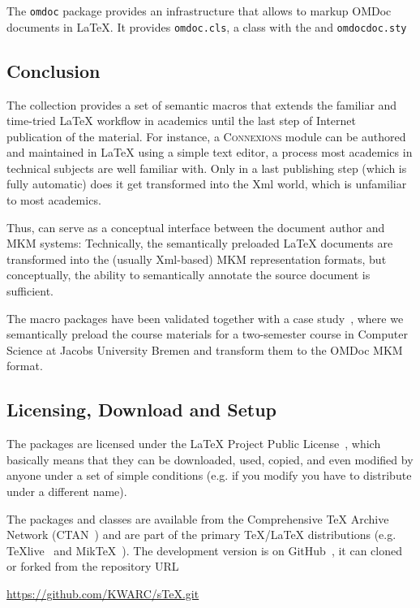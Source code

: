 \documentclass{article}
\makeatletter
\def\scsys#1{{{\sc #1}}\index{#1@{\sc #1}}}
\def\xml{\scsys{Xml}}
\def\omdoc{\scsys{OMDoc}}
\def\connexions{\scsys{Connexions}}
\def\connexions{\scshape{Connexions}}
\makeatother
\begin{document}
The \texttt{omdoc} package provides an infrastructure that allows to markup {\omdoc}
documents in {\LaTeX}. It provides \texttt{omdoc.cls}, a class with the and
{\texttt{omdocdoc.sty}}

\subsection{Conclusion}\label{sec:concl}

The {\stex} collection provides a set of semantic macros that extends the familiar and
time-tried {\LaTeX} workflow in academics until the last step of Internet publication of
the material. For instance, a {\connexions} module can be authored and maintained in
{\LaTeX} using a simple text editor, a process most academics in technical subjects are
well familiar with. Only in a last publishing step (which is fully automatic) does it get
transformed into the {\xml} world, which is unfamiliar to most academics. 

Thus, {\stex} can serve as a conceptual interface between the document author and MKM
systems: Technically, the semantically preloaded {\LaTeX} documents are transformed into
the (usually {\xml}-based) MKM representation formats, but conceptually, the ability to
semantically annotate the source document is sufficient.
 
The {\stex} macro packages have been validated together with a case
study~\cite{Kohlhase04:stex}, where we semantically preload the course materials for a
two-semester course in Computer Science at Jacobs University Bremen and transform them to
the {\omdoc} MKM format.

\subsection{Licensing, Download and Setup}\label{sec:setup}
 
The {\stex} packages are licensed under the {\LaTeX} Project Public License~\cite{LPPL},
which basically means that they can be downloaded, used, copied, and even modified by
anyone under a set of simple conditions (e.g. if you modify you have to distribute under a
different name). 

The {\stex} packages and classes are available from the Comprehensive {\TeX} Archive
Network (CTAN~\cite{CTAN:on}) and are part of the primary {\TeX/\LaTeX} distributions
(e.g. TeXlive~\cite{TeXLive:on} and MikTeX~\cite{MiKTeX:on}). The development version is
on GitHub~\cite{sTeX:github:on}, it can cloned or forked from the repository URL
\begin{center}
  \url{https://github.com/KWARC/sTeX.git}
\end{center}
 
\end{document}
